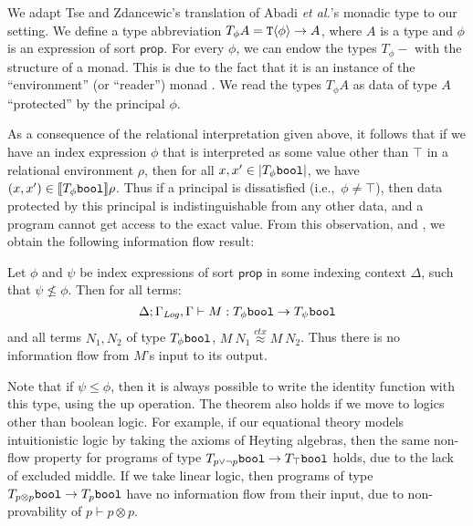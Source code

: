 We adapt Tse and Zdancewic's translation of Abadi \emph{et al.}'s monadic
type to our setting. We define a type abbreviation $T_\phi A =
\textup{\texttt{T}}\langle \phi \rangle \to A$, where $A$ is a type and $\phi$ is an
expression of sort $\mathsf{prop}$. For every $\phi$, we can endow the
types $T_\phi-$ with the structure of a monad. This is due to the fact
that it is an instance of the ``environment'' (or ``reader'') monad
\cite{jones95functional}. We read the types $T_\phi A$ as data of type
$A$ ``protected'' by the principal $\phi$.

As a consequence of the relational interpretation given above, it
follows that if we have an index expression $\phi$ that is interpreted
as some value other than $\top$ in a relational environment $\rho$,
then for all $x,x' \in \left| T_\phi\textup{\texttt{bool}}\right|$, we have $(x,x')
\in \llbracket T_\phi\textup{\texttt{bool}} \rrbracket{\rho}$. Thus if a principal is
dissatisfied (i.e.,~$\phi \not= \top$), then data protected by this
principal is indistinguishable from any other data, and a program
cannot get access to the exact value. From this observation, and
, we obtain the following information flow
result:

\begin{theorem}
  Let $\phi$ and $\psi$ be index expressions of sort $\mathsf{prop}$
  in some indexing context $\Delta$, such that $\psi \not\leq
  \phi$. Then for all terms:
  \begin{displaymath}
    \Delta; \Gamma_{\mathit{Log}},\Gamma \vdash M : T_\phi\textup{\texttt{bool}} \to T_\psi\textup{\texttt{bool}}
  \end{displaymath}
  and all terms $N_1,N_2$ of type $T_\phi\textup{\texttt{bool}}$, $M\ N_1
  \stackrel{ctx}\approx M\ N_2$.  Thus there is no information flow
  from $M$'s input to its output.
\end{theorem}
Note that if $\psi \leq \phi$, then it is always possible to write the
identity function with this type, using the $\mathrm{up}$ operation.
The theorem also holds if we move to logics other than boolean
logic. For example, if our equational theory models intuitionistic
logic by taking the axioms of Heyting algebras, then the same non-flow
property for programs of type $T_{p\lor\lnot p}\textup{\texttt{bool}} \to
T_\top\textup{\texttt{bool}}$ holds, due to the lack of excluded middle. If
we take linear logic, then programs of type $T_{p\otimes
  p}\textup{\texttt{bool}} \to T_p\textup{\texttt{bool}}$ have no information flow
from their input, due to non-provability of $p \vdash p \otimes p$.


